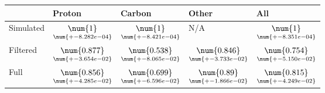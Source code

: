 \begin{tabular}{lllll}
\toprule
{} &                                              Proton &                                              Carbon &                                               Other &                                                 All \\
\midrule
Simulated &  $\underset{\num{+- 8.282e-04 }  }{\num{ 1 } }$ &  $\underset{\num{+- 8.421e-04 }  }{\num{ 1 } }$ &  N/A &  $\underset{\num{+- 8.351e-04 }  }{\num{ 1 } }$ \\
Filtered  &  $\underset{\num{+- 3.654e-02 }  }{\num{ 0.877 } }$ &  $\underset{\num{+- 8.065e-02 }  }{\num{ 0.538 } }$ &  $\underset{\num{+- 3.733e-02 }  }{\num{ 0.846 } }$ &  $\underset{\num{+- 5.150e-02 }  }{\num{ 0.754 } }$ \\
Full      &  $\underset{\num{+- 4.285e-02 }  }{\num{ 0.856 } }$ &  $\underset{\num{+- 6.596e-02 }  }{\num{ 0.699 } }$ &  $\underset{\num{+- 1.866e-02 }  }{\num{ 0.89 } }$ &  $\underset{\num{+- 4.249e-02 }  }{\num{ 0.815 } }$ \\
\bottomrule
\end{tabular}
